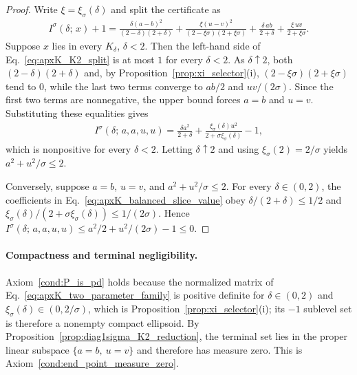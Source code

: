 \documentclass{article}
\begin{document}
\begin{proof}
Write $\xi=\xi_\sigma(\delta)$ and split the certificate as
\begin{align}
    I^\sigma(\delta;\,x)+1
    =
    \frac{\delta(a-b)^2}{(2-\delta)(2+\delta)}
    +
    \frac{\xi(u-v)^2}{(2-\xi\sigma)(2+\xi\sigma)}
    +
    \frac{\delta\,ab}{2+\delta}
    +
    \frac{\xi\,uv}{2+\xi\sigma}.
    \label{eq:apxK_K2_split}
\end{align}
Suppose $x$ lies in every $K_\delta$, $\delta<2$. Then the left-hand side of
Eq.~\eqref{eq:apxK_K2_split} is at most $1$ for every $\delta<2$. As
$\delta\uparrow2$, both $(2-\delta)(2+\delta)$ and, by
Proposition~\ref{prop:xi_selector}(i),
$(2-\xi\sigma)(2+\xi\sigma)$ tend to $0$, while the last two terms converge to
$ab/2$ and $uv/(2\sigma)$. Since the first two terms are nonnegative, the
upper bound forces $a=b$ and $u=v$. Substituting these equalities gives
\begin{align}
    I^\sigma(\delta;\,a,a,u,u)
    =
    \frac{\delta a^2}{2+\delta}
    +
    \frac{\xi_\sigma(\delta)u^2}{2+\sigma\xi_\sigma(\delta)}
    -1,
    \label{eq:apxK_balanced_slice_value}
\end{align}
which is nonpositive for every $\delta<2$. Letting $\delta\uparrow2$ and using
$\xi_\sigma(2)=2/\sigma$ yields $a^2+u^2/\sigma\le2$.

Conversely, suppose $a=b$, $u=v$, and $a^2+u^2/\sigma\le2$. For every
$\delta\in(0,2)$, the coefficients in
Eq.~\eqref{eq:apxK_balanced_slice_value} obey
$\delta/(2+\delta)\le1/2$ and
$\xi_\sigma(\delta)/(2+\sigma\xi_\sigma(\delta))\le1/(2\sigma)$. Hence
$I^\sigma(\delta;\,a,a,u,u)\le a^2/2+u^2/(2\sigma)-1\le0$.
\end{proof}

\paragraph{Compactness and terminal negligibility.}
Axiom~\ref{cond:P_is_pd} holds because the normalized matrix of
Eq.~\eqref{eq:apxK_two_parameter_family} is positive definite for
$\delta\in(0,2)$ and $\xi_\sigma(\delta)\in(0,2/\sigma)$, which is
Proposition~\ref{prop:xi_selector}(i); its $-1$ sublevel set is therefore a
nonempty compact ellipsoid. By
Proposition~\ref{prop:diag1sigma_K2_reduction}, the terminal set lies in the
proper linear subspace $\{a=b,\ u=v\}$ and therefore has measure zero. This is
Axiom~\ref{cond:end_point_measure_zero}.
\end{document}
